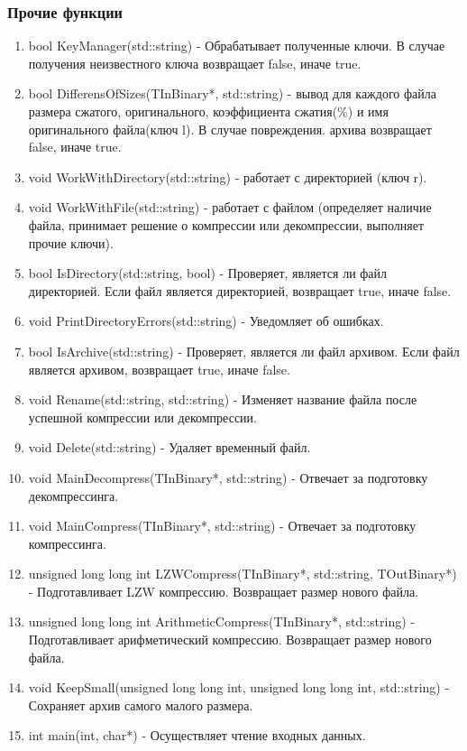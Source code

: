 \documentclass[12pt]{article}
\begin{document}
	\subsubsection*{Прочие функции}
	\noindent
	\begin{enumerate}
		\item bool KeyManager(std::string) - Обрабатывает полученные ключи. В случае получения неизвестного ключа возвращает false, иначе true.
		\item bool DifferensOfSizes(TInBinary*, std::string) - вывод для каждого файла размера сжатого, оригинального, коэффициента сжатия(\%) и имя оригинального файла(ключ l). В случае повреждения. архива возвращает false, иначе true.
		\item void WorkWithDirectory(std::string) - работает с директорией (ключ r).
		\item void WorkWithFile(std::string) - работает с файлом (определяет наличие файла, принимает решение о компрессии или декомпрессии, выполняет прочие ключи).
		\item bool IsDirectory(std::string, bool) - Проверяет, является ли файл директорией. Если файл является директорией, возвращает true, иначе false.
		\item void PrintDirectoryErrors(std::string) - Уведомляет об ошибках.
		\item bool IsArchive(std::string) - Проверяет, является ли файл архивом. Если файл является архивом, возвращает true, иначе false.
		\item void Rename(std::string, std::string) - Изменяет название файла после успешной компрессии или декомпрессии.
		\item void Delete(std::string) - Удаляет временный файл.
		\item void MainDecompress(TInBinary*, std::string) - Отвечает за подготовку декомпрессинга.
		\item void MainCompress(TInBinary*, std::string) - Отвечает за подготовку компрессинга.
		\item unsigned long long int LZWCompress(TInBinary*, std::string, TOutBinary*) - Подготавливает LZW компрессию. Возвращает размер нового файла.
		\item unsigned long long int ArithmeticCompress(TInBinary*, std::string) - Подготавливает арифметический компрессию. Возвращает размер нового файла.
		\item void KeepSmall(unsigned long long int, unsigned long long int, std::string) - Сохраняет архив самого малого размера.
		\item int main(int, char*) - Осуществляет чтение входных данных.
	\end{enumerate}
	
\end{document}
